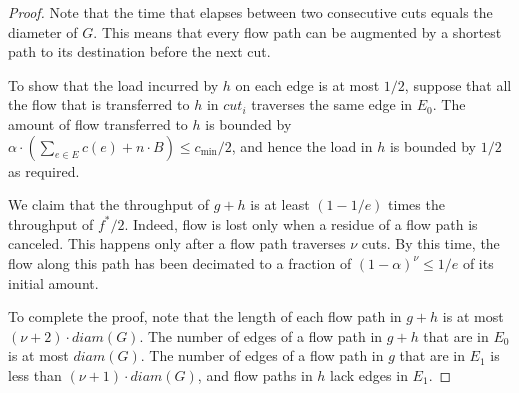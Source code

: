\documentclass[11pt]{article}
\newenvironment{proof sketch}[1]{\noindent {\emph{Proof sketch of #1:}}}{\hfill \qed}
\newcommand{\cut}{\textit{cut}}
\newcommand{\diam}{\textit{diam}}
\begin{document}
\begin{proof}
  Note that the time that elapses between two consecutive cuts equals
  the diameter of $G$.  This means that every flow path can be
  augmented by a shortest path to its destination before the next cut.

  To show that the load incurred by $h$ on each edge is at most $1/2$,
  suppose that all the flow that is transferred to $h$ in $\cut_i$
  traverses the same edge in $E_0$.  The amount of flow
  transferred to $h$ is bounded by $\alpha\cdot (\sum_{e\in E} c(e)+n\cdot B)\leq
  c_{\min}/2$, and hence the load in $h$ is bounded by $1/2$ as required.

  We claim that the throughput of $g+h$ is at least $(1-1/e)$ times
  the throughput of $f^*/2$. Indeed, flow is lost only when a residue
  of a flow path is canceled.  This happens only after a flow path
  traverses $\nu$ cuts.  By this time, the flow along this
  path has been decimated to a fraction of $(1-\alpha)^{\nu} \leq 1/e$ of its initial amount.

To complete the proof, note that the length of each flow path in $g+h$
is at most $(\nu+2)\cdot \diam(G)$. The number of edges of a flow path
in $g+h$ that are in $E_0$ is at most $\diam(G)$. The number of edges of a flow path in $g$
that are in $E_1$ is less than $(\nu+1)\cdot \diam(G)$, and flow paths in $h$ lack edges in $E_1$.
\end{proof}
\end{document}
